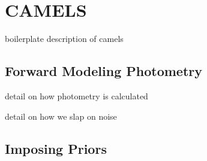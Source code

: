 \section{CAMELS} \label{sec:sims} 
boilerplate description of camels 

\subsection{Forward Modeling Photometry} \label{sec:fm}
detail on how photometry is calculated

detail on how we slap on noise 

\subsection{Imposing Priors} \label{sec:priors}
